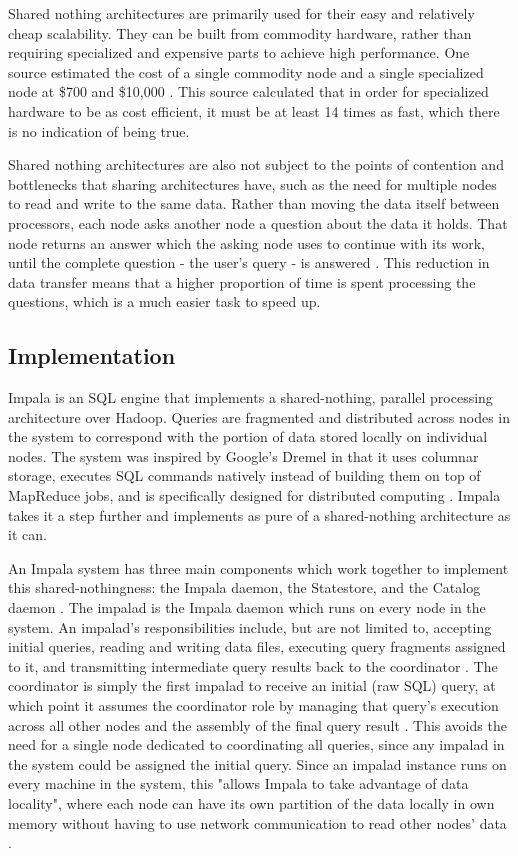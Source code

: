 \documentclass[onecolumn, draftclsnofoot,10pt, compsoc]{IEEEtran}
\begin{document}
Shared nothing architectures are primarily used for their easy and relatively cheap scalability.
They can be built from commodity hardware, rather than requiring specialized and expensive parts to achieve high performance. 
One source estimated the cost of a single commodity node and a single specialized node at \$700 and \$10,000 \cite{HiPerf}. 
This source calculated that in order for specialized hardware to be as cost efficient, it must be at least 14 times as fast, which there is no indication of being true.

Shared nothing architectures are also not subject to the points of contention and bottlenecks that sharing architectures have, such as the need for multiple nodes to read and write to the same data.
Rather than moving the data itself between processors, each node asks another node a question about the data it holds.
That node returns an answer which the asking node uses to continue with its work, until the complete question - the user’s query - is answered \cite{DeWittFuture}.
This reduction in data transfer means that a higher proportion of time is spent processing the questions, which is a much easier task to speed up.


	
    \subsection{Implementation}
    Impala is an SQL engine that implements a shared-nothing, parallel processing architecture over Hadoop.
    Queries are fragmented and distributed across nodes in the system to correspond with the portion of data stored locally on individual nodes.
    The system was inspired by Google’s Dremel in that it uses columnar storage, executes SQL commands natively instead of building them on top of MapReduce jobs, and is specifically designed for distributed computing \cite{SQLonHadoop} \cite{Dremel}.
    Impala takes it a step further and implements as pure of a shared-nothing architecture as it can.

An Impala system has three main components which work together to implement this shared-nothingness: the Impala daemon, the Statestore, and the Catalog daemon \cite{ImpalaGuide}. 
The impalad is the Impala daemon which runs on every node in the system.
An impalad's responsibilities include, but are not limited to, accepting initial queries, reading and writing data files, executing query fragments assigned to it, and transmitting intermediate query results back to the coordinator \cite{Impala} \cite{ImpalaGuide}.
The coordinator is simply the first impalad to receive an initial (raw SQL) query, at which point it assumes the coordinator role by managing that query’s execution across all other nodes and the assembly of the final query result \cite{Impala}. 
This avoids the need for a single node dedicated to coordinating all queries, since any impalad in the system could be assigned the initial query.
Since an impalad instance runs on every machine in the system, this "allows Impala to take advantage of data locality", where each node can have its own partition of the data locally in own memory without having to use network communication to read other nodes’ data \cite{Impala}.
\end{document}
